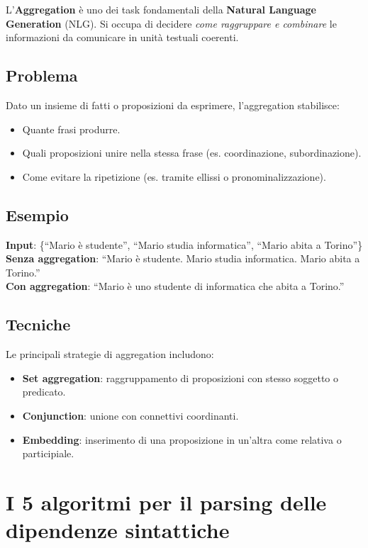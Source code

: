 \documentclass[12pt,a4paper]{article}
\begin{document}
L'\textbf{Aggregation} è uno dei task fondamentali della \textbf{Natural Language Generation} (NLG). Si occupa di decidere \emph{come raggruppare e combinare} le informazioni da comunicare in unità testuali coerenti.

\subsection{Problema}
Dato un insieme di fatti o proposizioni da esprimere, l'aggregation stabilisce:
\begin{itemize}[leftmargin=1.5em]
  \item Quante frasi produrre.
  \item Quali proposizioni unire nella stessa frase (es. coordinazione, subordinazione).
  \item Come evitare la ripetizione (es. tramite ellissi o pronominalizzazione).
\end{itemize}

\subsection{Esempio}
\textbf{Input}: \{``Mario è studente'', ``Mario studia informatica'', ``Mario abita a Torino''\}\\
\textbf{Senza aggregation}: ``Mario è studente. Mario studia informatica. Mario abita a Torino.''\\
\textbf{Con aggregation}: ``Mario è uno studente di informatica che abita a Torino.''

\subsection{Tecniche}
Le principali strategie di aggregation includono:
\begin{itemize}[leftmargin=1.5em]
  \item \textbf{Set aggregation}: raggruppamento di proposizioni con stesso soggetto o predicato.
  \item \textbf{Conjunction}: unione con connettivi coordinanti.
  \item \textbf{Embedding}: inserimento di una proposizione in un'altra come relativa o participiale.
\end{itemize}

\section{I 5 algoritmi per il parsing delle dipendenze sintattiche}
\end{document}
